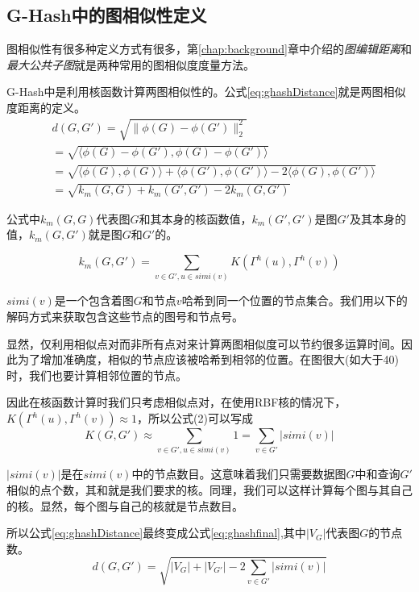 \documentclass{XDBAthesis}
\begin{document}
\subsection{G-Hash中的图相似性定义}
图相似性有很多种定义方式有很多，第\ref{chap:background}章中介绍的\emph{图编辑距离}和\emph{最大公共子图}就是两种常用的图相似度度量方法。

G-Hash中是利用核函数计算两图相似性的。公式\ref{eq:ghashDistance}就是两图相似度距离的定义。
\begin{equation}
\begin{split}
    &d(G,G')=\sqrt{\|\phi(G)-\phi(G')\|_{2}^{2}}\\
              &=\sqrt{\langle\phi(G)-\phi(G'),\phi(G)-\phi(G')\rangle}\\
              &=\sqrt{\langle\phi(G),\phi(G)\rangle+\langle\phi(G'),\phi(G')\rangle-2\langle\phi(G),\phi(G')\rangle}\\
              &=\sqrt{k_{m}(G,G)+k_{m}(G',G')-2k_{m}(G,G')}
\end{split}
\label{eq:ghashDistance}
\end{equation}

公式中$k_{m}(G,G)$代表图$G$和其本身的核函数值，$k_{m}(G',G')$是图$G'$及其本身的值，$k_{m}(G,G')$就是图$G$和$G'$的。

\begin{equation}
k_{m}(G,G')=\sum_{v\in G',u\in simi(v)}K(\Gamma^{h}(u),\Gamma^{h}(v))
\end{equation}

$simi(v)$是一个包含着图$G$和节点$v$哈希到同一个位置的节点集合。我们用以下的解码方式来获取包含这些节点的图号和节点号。

显然，仅利用相似点对而非所有点对来计算两图相似度可以节约很多运算时间。因此为了增加准确度，相似的节点应该被哈希到相邻的位置。在图很大(如大于40)时，我们也要计算相邻位置的节点。

因此在核函数计算时我们只考虑相似点对，在使用RBF核的情况下，$K(\Gamma^{h}(u),\Gamma^{h}(v))\approx1$，所以公式(2)可以写成
\begin{equation}
    K(G,G')\approx\sum_{v\in G',u\in simi(v)}1=\sum_{v\in G'}|simi(v)| 
\end{equation}

$|simi(v)|$是在$simi(v)$中的节点数目。这意味着我们只需要数据图$G$中和查询$G'$相似的点个数，其和就是我们要求的核。同理，我们可以这样计算每个图与其自己的核。显然，每个图与自己的核就是节点数目。

所以公式\ref{eq:ghashDistance}最终变成公式\ref{eq:ghashfinal},其中$|V_{G}|$代表图$G$的节点数。
\begin{equation}
    d(G,G')=\sqrt{|V_{G}|+|V_{G'}| -2\sum_{v\in G'}|simi(v)| }
    \label{eq:ghashfinal}
\end{equation}
\end{document}
